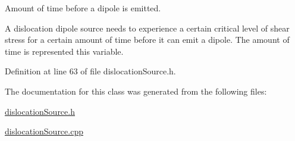 \-Amount of time before a dipole is emitted. 

\-A dislocation dipole source needs to experience a certain critical level of shear stress for a certain amount of time before it can emit a dipole. \-The amount of time is represented this variable. 

\-Definition at line 63 of file dislocation\-Source.\-h.



\-The documentation for this class was generated from the following files\-:\begin{DoxyCompactItemize}
\item 
\hyperlink{dislocationSource_8h}{dislocation\-Source.\-h}\item 
\hyperlink{dislocationSource_8cpp}{dislocation\-Source.\-cpp}\end{DoxyCompactItemize}
